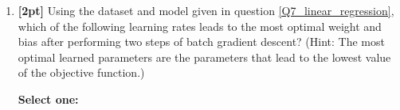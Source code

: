 \documentclass[12pt]{article}
\renewcommand{\circle}{\tikz\draw[black] (0,0) circle (1ex);}
\begin{document}
\begin{enumerate}
    \begin{tcolorbox}[fit,height=1cm, width=4cm, blank, borderline={1pt}{-2pt},nobeforeafter]
    \end{tcolorbox}
    
    
    
    \item \textbf{[2pt]} Using the dataset and model given in question \ref{Q7_linear_regression}, which of the following learning rates leads to the most optimal weight and bias after performing two steps of batch gradient descent? (Hint: The most optimal learned parameters are the parameters that lead to the lowest value of the objective function.)
    
    \textbf{Select one:}
    
    
    

    \clearpage
\end{enumerate}

\clearpage

\end{document}
